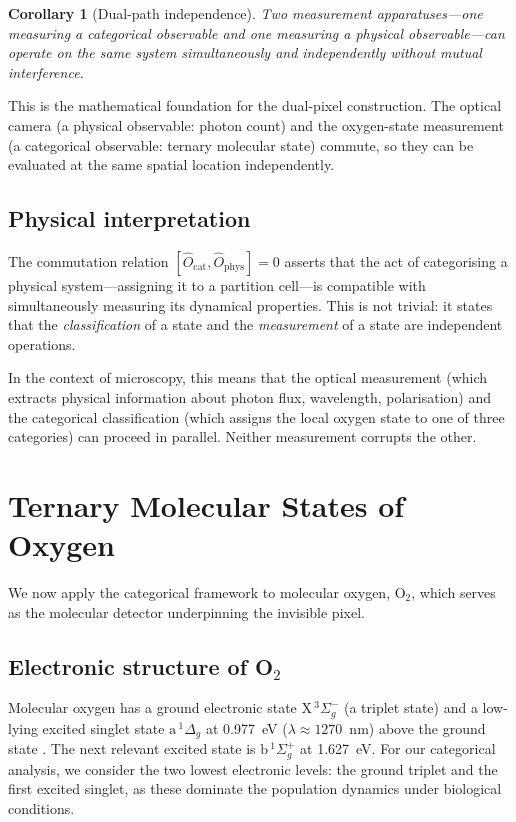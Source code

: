 \documentclass[11pt,twocolumn,a4paper]{article}
\newtheorem{corollary}[theorem]{Corollary}
\newcommand{\Ocat}{\hat{O}_{\mathrm{cat}}}
\newcommand{\Ophys}{\hat{O}_{\mathrm{phys}}}
\begin{document}
\begin{corollary}[Dual-path independence]\label{cor:dualpath}
Two measurement apparatuses---one measuring a categorical observable and one measuring a physical observable---can operate on the same system simultaneously and independently without mutual interference.
\end{corollary}

This is the mathematical foundation for the dual-pixel construction.
The optical camera (a physical observable: photon count) and the oxygen-state measurement (a categorical observable: ternary molecular state) commute, so they can be evaluated at the same spatial location independently.

\subsection{Physical interpretation}

The commutation relation $[\Ocat, \Ophys] = 0$ asserts that the act of categorising a physical system---assigning it to a partition cell---is compatible with simultaneously measuring its dynamical properties.
This is not trivial: it states that the \emph{classification} of a state and the \emph{measurement} of a state are independent operations.

In the context of microscopy, this means that the optical measurement (which extracts physical information about photon flux, wavelength, polarisation) and the categorical classification (which assigns the local oxygen state to one of three categories) can proceed in parallel.
Neither measurement corrupts the other.


\section{Ternary Molecular States of Oxygen}\label{sec:ternary}

We now apply the categorical framework to molecular oxygen, O$_2$, which serves as the molecular detector underpinning the invisible pixel.

\subsection{Electronic structure of O$_2$}

Molecular oxygen has a ground electronic state $\mathrm{X}\,^3\Sigma_g^-$ (a triplet state) and a low-lying excited singlet state $\mathrm{a}\,^1\Delta_g$ at 0.977~eV ($\lambda \approx 1270$~nm) above the ground state \citep{Herzberg1950,Krupenie1972}.
The next relevant excited state is $\mathrm{b}\,^1\Sigma_g^+$ at 1.627~eV.
For our categorical analysis, we consider the two lowest electronic levels: the ground triplet and the first excited singlet, as these dominate the population dynamics under biological conditions.
\end{document}
